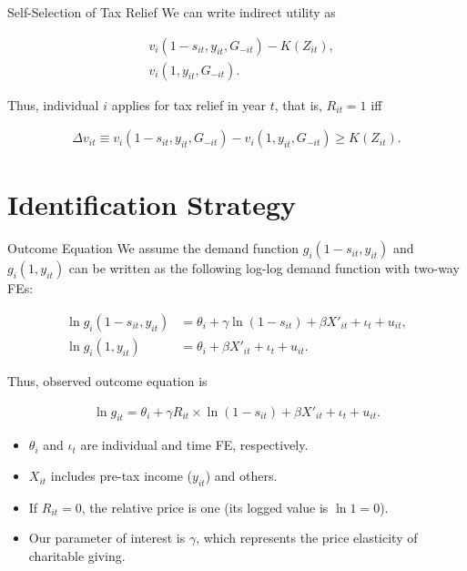 \documentclass[
  ignorenonframetext,
  aspectratio=169,
]{beamer}
\providecommand{\tightlist}{%
  \setlength{\itemsep}{0pt}\setlength{\parskip}{0pt}}
\begin{document}
\begin{frame}{Self-Selection of Tax Relief}
\protect\hypertarget{self-selection-of-tax-relief}{}
We can write indirect utility as

\begin{align}
  &v_i(1 - s_{it}, y_{it}, G_{-it}) - K(Z_{it}),  \\
  &v_i(1, y_{it}, G_{-it}).
\end{align}

Thus, individual \(i\) applies for tax relief in year \(t\),
that is, \(R_{it} = 1\) iff

\begin{align}
  \Delta v_{it} \equiv
  v_i(1 - s_{it}, y_{it}, G_{-it}) - v_i(1, y_{it}, G_{-it})
  \ge K(Z_{it}).
\end{align}
\end{frame}

\hypertarget{identification-strategy}{%
\section{Identification Strategy}\label{identification-strategy}}

\begin{frame}{Outcome Equation}
\protect\hypertarget{outcome-equation}{}
We assume the demand function \(g_i(1 - s_{it}, y_{it})\) and \(g_i(1, y_{it})\) can be written as the following log-log demand function with two-way FEs:

\begin{align}
  \ln g_i(1 - s_{it}, y_{it}) &= \theta_i + \gamma \ln (1 - s_{it}) + \beta X'_{it} + \iota_t + u_{it}, \\
  \ln g_i(1, y_{it}) &= \theta_i + \beta X'_{it} + \iota_t + u_{it}.
\end{align}

Thus, observed outcome equation is

\begin{align}
  \ln g_{it} = \theta_i + \gamma R_{it} \times \ln(1 - s_{it}) + \beta X'_{it} + \iota_t + u_{it}.
\end{align}

\begin{itemize}
\tightlist
\item
  \(\theta_i\) and \(\iota_t\) are individual and time FE, respectively.
\item
  \(X_{it}\) includes pre-tax income (\(y_{it}\)) and others.
\item
  If \(R_{it} = 0\), the relative price is one (its logged value is \(\ln 1 = 0\)).
\item
  Our parameter of interest is \(\gamma\), which represents the price elasticity of charitable giving.
\end{itemize}
\end{frame}
\end{document}
